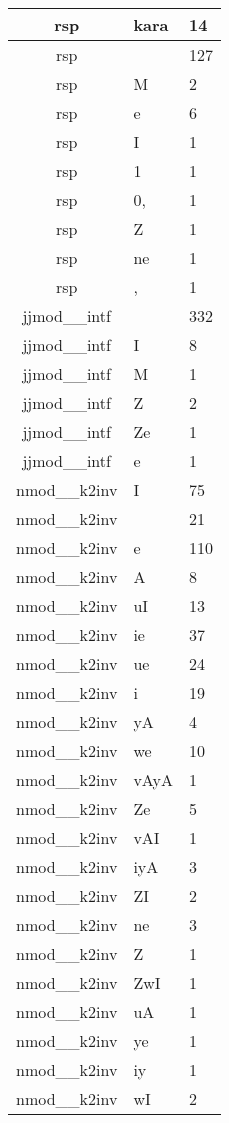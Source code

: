 \documentclass[a4 paper]{article}
\begin{document}
\begin{longtable}{cp{}p{}}
rsp & kara & 14\\ \midrule rsp &  & 127\\ \midrule rsp & M & 2\\ \midrule rsp & e & 6\\ \midrule rsp & I & 1\\ \midrule rsp & 1 & 1\\ \midrule rsp & 0, & 1\\ \midrule rsp & Z & 1\\ \midrule rsp & ne & 1\\ \midrule rsp & , & 1\\ \midrule 
jjmod\_\_intf &  & 332\\ \midrule jjmod\_\_intf & I & 8\\ \midrule jjmod\_\_intf & M & 1\\ \midrule jjmod\_\_intf & Z & 2\\ \midrule jjmod\_\_intf & Ze & 1\\ \midrule jjmod\_\_intf & e & 1\\ \midrule 
nmod\_\_k2inv & I & 75\\ \midrule nmod\_\_k2inv &  & 21\\ \midrule nmod\_\_k2inv & e & 110\\ \midrule nmod\_\_k2inv & A & 8\\ \midrule nmod\_\_k2inv & uI & 13\\ \midrule nmod\_\_k2inv & ie & 37\\ \midrule nmod\_\_k2inv & ue & 24\\ \midrule nmod\_\_k2inv & i & 19\\ \midrule nmod\_\_k2inv & yA & 4\\ \midrule nmod\_\_k2inv & we & 10\\ \midrule nmod\_\_k2inv & vAyA & 1\\ \midrule nmod\_\_k2inv & Ze & 5\\ \midrule nmod\_\_k2inv & vAI & 1\\ \midrule nmod\_\_k2inv & iyA & 3\\ \midrule nmod\_\_k2inv & ZI & 2\\ \midrule nmod\_\_k2inv & ne & 3\\ \midrule nmod\_\_k2inv & Z & 1\\ \midrule nmod\_\_k2inv & ZwI & 1\\ \midrule nmod\_\_k2inv & uA & 1\\ \midrule nmod\_\_k2inv & ye & 1\\ \midrule nmod\_\_k2inv & iy & 1\\ \midrule nmod\_\_k2inv & wI & 2\\ \midrule 

\end{longtable}
\end{document}
